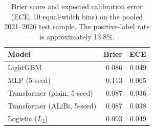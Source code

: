 \documentclass[sigconf,review,anonymous]{acmart}
\begin{document}
\begin{table}[t]
\centering
\footnotesize
\begin{tabular}{lrr}
\toprule
Model & Brier & ECE \\
\midrule
LightGBM & 0.086 & 0.049 \\
MLP (5-seed) & 0.113 & 0.065 \\
Transformer (plain, 5-seed) & 0.087 & 0.036 \\
Transformer (ALiBi, 5-seed) & 0.087 & 0.038 \\
Logistic ($L_2$) & 0.093 & 0.049 \\
\bottomrule
\end{tabular}
\caption{Brier score and expected calibration error (ECE, 10 equal-width bins) on the pooled 2021--2026 test sample. The positive-label rate is approximately 13.8\%.}
\label{tab:calibration}
\end{table}
\end{document}
